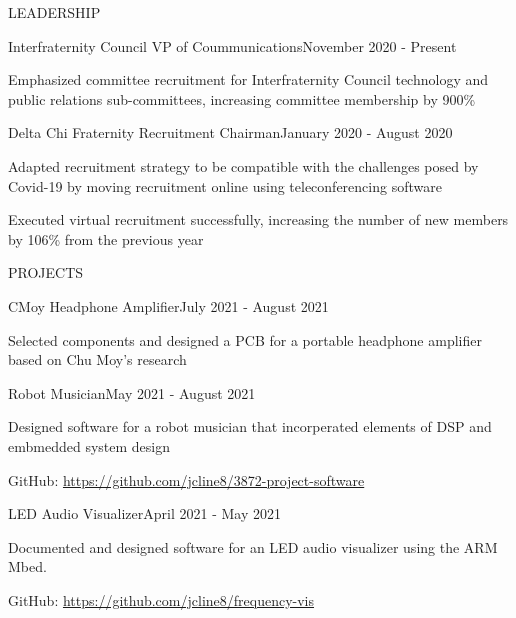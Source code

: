\documentclass{resume}
\begin{document}
\begin{rSection}{LEADERSHIP}
	\begin{rSubsection}{Interfraternity Council VP of Coummunications}{November 2020 - Present}{}{}{}
		\item Emphasized committee recruitment for Interfraternity Council technology and public relations sub-committees, increasing committee membership by 900\%
	\end{rSubsection}
	\begin{rSubsection}{Delta Chi Fraternity Recruitment Chairman}{January 2020 - August 2020}{}{}{}
		\item Adapted recruitment strategy to be compatible with the challenges posed by Covid-19 by moving recruitment online using teleconferencing software
		\item Executed virtual recruitment successfully, increasing the number of new members by 106\% from the previous year
	\end{rSubsection}
\end{rSection}
\begin{rSection}{PROJECTS}
	\begin{rSubsection}{CMoy Headphone Amplifier}{July 2021 - August 2021}{}{}{}
		\item Selected components and designed a PCB for a portable headphone amplifier based on Chu Moy's research
	\end{rSubsection}
	\begin{rSubsection}{Robot Musician}{May 2021 - August 2021}{}{}{}
		\item Designed software for a robot musician that incorperated elements of DSP and embmedded system design
		\item GitHub: \url{https://github.com/jcline8/3872-project-software}
	\end{rSubsection}
	\begin{rSubsection}{LED Audio Visualizer}{April 2021 - May 2021}{}{}{}
		\item Documented and designed software for an LED audio visualizer using the ARM Mbed.
		\item GitHub: \url{https://github.com/jcline8/frequency-vis}
	\end{rSubsection}
\end{rSection}
\end{document}
